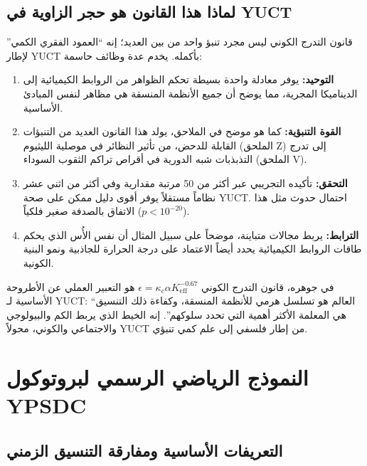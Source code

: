 \documentclass[11pt,a4paper]{article}
\begin{document}
	\subsection{لماذا هذا القانون هو حجر الزاوية في YUCT}
	
	قانون التدرج الكوني ليس مجرد تنبؤ واحد من بين العديد؛ إنه ``العمود الفقري الكمي'' لإطار YUCT بأكمله. يخدم عدة وظائف حاسمة:
	\begin{enumerate}
		\item \textbf{التوحيد:} يوفر معادلة واحدة بسيطة تحكم الظواهر من الروابط الكيميائية إلى الديناميكا المجرية، مما يوضح أن جميع الأنظمة المنسقة هي مظاهر لنفس المبادئ الأساسية.
		\item \textbf{القوة التنبؤية:} كما هو موضح في الملاحق، يولد هذا القانون العديد من التنبؤات القابلة للدحض، من تأثير النظائر في موصلية الليثيوم (الملحق Z) إلى تدرج التذبذبات شبه الدورية في أقراص تراكم الثقوب السوداء (الملحق V).
		\item \textbf{التحقق:} تأكيده التجريبي عبر أكثر من 50 مرتبة مقدارية وفي أكثر من اثني عشر نظاماً مستقلاً يوفر أقوى دليل ممكن على صحة YUCT. احتمال حدوث مثل هذا الاتفاق بالصدفة صغير فلكياً ($p < 10^{-20}$).
		\item \textbf{الترابط:} يربط مجالات متباينة، موضحاً على سبيل المثال أن نفس الأُس الذي يحكم طاقات الروابط الكيميائية يحدد أيضاً الاعتماد على درجة الحرارة للجاذبية ونمو البنية الكونية.
	\end{enumerate}
	
	في جوهره، قانون التدرج الكوني $\epsilon = \kappa_c \alpha K_{\mathrm{eff}}^{-0.67}$ هو التعبير العملي عن الأطروحة الأساسية لـ YUCT: ``العالم هو تسلسل هرمي للأنظمة المنسقة، وكفاءة ذلك التنسيق هي المعلمة الأكثر أهمية التي تحدد سلوكهم''. إنه الخيط الذي يربط الكم والبيولوجي والاجتماعي والكوني، محولاً YUCT من إطار فلسفي إلى علم كمي تنبؤي.
	
	\section{النموذج الرياضي الرسمي لبروتوكول YPSDC}
	\label{sec:formal-model}
	
	\subsection{التعريفات الأساسية ومفارقة التنسيق الزمني}
	
\end{document}
